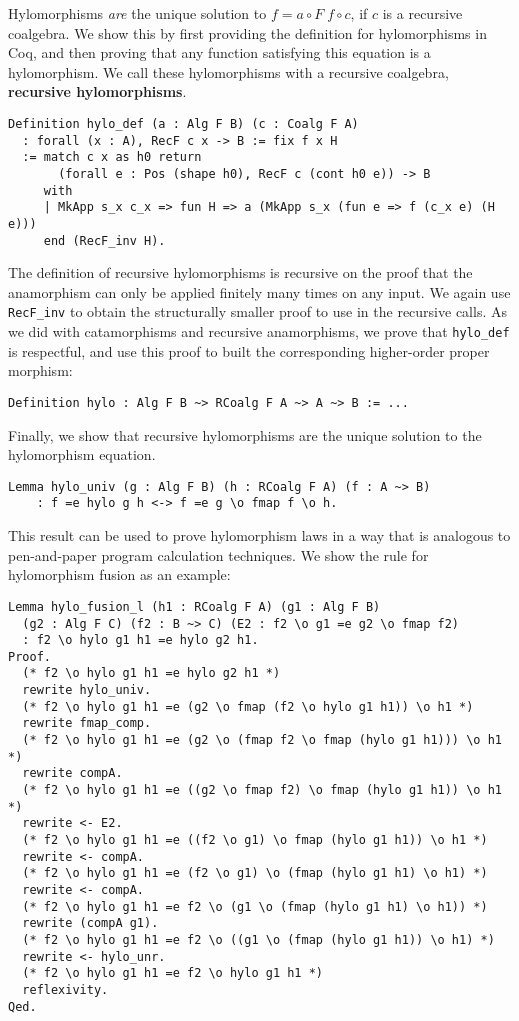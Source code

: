 \documentclass[a4paper, UKenglish, cleveref, autoref, thm-restate]{lipics-v2021}
\begin{document}
Hylomorphisms \emph{are} the unique solution to $f = a \circ F\; f \circ c$, if
$c$ is a recursive coalgebra. We show this by first providing the definition
for hylomorphisms in Coq, and then proving that any function satisfying this
equation is a hylomorphism. We call these hylomorphisms with a recursive
coalgebra, \textbf{recursive hylomorphisms}.
\begin{verbatim}
Definition hylo_def (a : Alg F B) (c : Coalg F A) 
  : forall (x : A), RecF c x -> B := fix f x H 
  := match c x as h0 return
       (forall e : Pos (shape h0), RecF c (cont h0 e)) -> B
     with
     | MkApp s_x c_x => fun H => a (MkApp s_x (fun e => f (c_x e) (H e)))
     end (RecF_inv H).
\end{verbatim}
The definition of recursive hylomorphisms is recursive on the proof that the
anamorphism can only be applied finitely many times on any input. We again use
\texttt{RecF_inv} to obtain the structurally smaller proof to use in
the recursive calls.  As we did with catamorphisms and recursive anamorphisms,
we prove that \texttt{hylo_def} is respectful, and use this proof to
built the corresponding higher-order proper morphism:
\begin{verbatim}
Definition hylo : Alg F B ~> RCoalg F A ~> A ~> B := ...
\end{verbatim}
Finally, we show that recursive hylomorphisms are the unique solution to
the hylomorphism equation.
\begin{verbatim}
Lemma hylo_univ (g : Alg F B) (h : RCoalg F A) (f : A ~> B)
    : f =e hylo g h <-> f =e g \o fmap f \o h.
\end{verbatim}
This result can be used to prove hylomorphism laws in a way that is analogous
to pen-and-paper program calculation techniques. We show the rule for 
hylomorphism fusion as an example:
\begin{verbatim}
Lemma hylo_fusion_l (h1 : RCoalg F A) (g1 : Alg F B) 
  (g2 : Alg F C) (f2 : B ~> C) (E2 : f2 \o g1 =e g2 \o fmap f2)
  : f2 \o hylo g1 h1 =e hylo g2 h1.
Proof.
  (* f2 \o hylo g1 h1 =e hylo g2 h1 *)
  rewrite hylo_univ.
  (* f2 \o hylo g1 h1 =e (g2 \o fmap (f2 \o hylo g1 h1)) \o h1 *)
  rewrite fmap_comp.
  (* f2 \o hylo g1 h1 =e (g2 \o (fmap f2 \o fmap (hylo g1 h1))) \o h1 *)
  rewrite compA.
  (* f2 \o hylo g1 h1 =e ((g2 \o fmap f2) \o fmap (hylo g1 h1)) \o h1 *)
  rewrite <- E2.
  (* f2 \o hylo g1 h1 =e ((f2 \o g1) \o fmap (hylo g1 h1)) \o h1 *)
  rewrite <- compA.
  (* f2 \o hylo g1 h1 =e (f2 \o g1) \o (fmap (hylo g1 h1) \o h1) *)
  rewrite <- compA.
  (* f2 \o hylo g1 h1 =e f2 \o (g1 \o (fmap (hylo g1 h1) \o h1)) *)
  rewrite (compA g1).
  (* f2 \o hylo g1 h1 =e f2 \o ((g1 \o (fmap (hylo g1 h1)) \o h1) *)
  rewrite <- hylo_unr.
  (* f2 \o hylo g1 h1 =e f2 \o hylo g1 h1 *)
  reflexivity.
Qed.
\end{verbatim}
\end{document}
